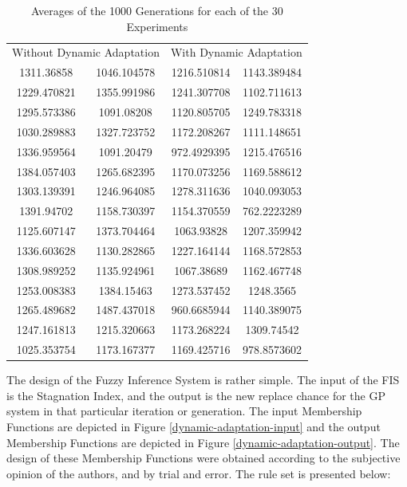 \documentclass[12pt,journal,draftcls,onecolumn]{IEEEtran}
\begin{document}
\begin{table}
  \centering
  \caption{Averages of the 1000 Generations for each of the 30 Experiments}
    \label{dynamic-vs-non-dynamic-table}
    \begin{tabular}{ c c | c c}
        \multicolumn{2}{c}{Without Dynamic Adaptation} & \multicolumn{2}{c}{With Dynamic Adaptation} \\ 
         1311.36858  & 1046.104578 & 1216.510814 & 1143.389484 \\ 
         1229.470821 & 1355.991986 & 1241.307708 & 1102.711613 \\ 
         1295.573386 & 1091.08208  & 1120.805705 & 1249.783318 \\ 
         1030.289883 & 1327.723752 & 1172.208267 & 1111.148651 \\ 
         1336.959564 & 1091.20479  & 972.4929395 & 1215.476516 \\ 
         1384.057403 & 1265.682395 & 1170.073256 & 1169.588612 \\ 
         1303.139391 & 1246.964085 & 1278.311636 & 1040.093053 \\ 
         1391.94702  & 1158.730397 & 1154.370559 & 762.2223289 \\ 
         1125.607147 & 1373.704464 & 1063.93828  & 1207.359942 \\ 
         1336.603628 & 1130.282865 & 1227.164144 & 1168.572853 \\
         1308.989252 & 1135.924961 & 1067.38689  & 1162.467748 \\
         1253.008383 & 1384.15463  & 1273.537452 & 1248.3565   \\
         1265.489682 & 1487.437018 & 960.6685944 & 1140.389075 \\
         1247.161813 & 1215.320663 & 1173.268224 & 1309.74542  \\
         1025.353754 & 1173.167377 & 1169.425716 & 978.8573602 \\
    \end{tabular} 
\end{table}

The design of the Fuzzy Inference System is rather simple. The input of the FIS is the Stagnation Index, and the output is the new replace chance for the GP system in that particular iteration or generation. The input Membership Functions are depicted in Figure \ref{dynamic-adaptation-input} and the output Membership Functions are depicted in Figure \ref{dynamic-adaptation-output}. The design of these Membership Functions were obtained according to the subjective opinion of the authors, and by trial and error. The rule set is presented below:
\end{document}
